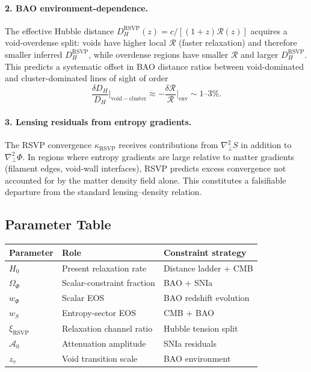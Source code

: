 \documentclass[12pt,a4paper]{article}
\theoremstyle{remark}
\newcommand{\Rcal}{\mathcal{R}}
\newcommand{\Acal}{\mathcal{A}}
\newcommand{\DHr}{D_H^{\mathrm{RSVP}}}
\begin{document}
\paragraph{2. BAO environment-dependence.}
The effective Hubble distance $\DHr(z) = c/[(1+z)\Rcal(z)]$ acquires a
void-overdense split: voids have higher local $\Rcal$ (faster relaxation) and
therefore smaller inferred $\DHr$, while overdense regions have smaller $\Rcal$
and larger $\DHr$. This predicts a systematic offset in BAO distance ratios
between void-dominated and cluster-dominated lines of sight of order
\begin{equation}
\frac{\delta D_H}{D_H}\bigg|_{\mathrm{void-cluster}}
\approx -\frac{\delta\Rcal}{\Rcal}\bigg|_{\mathrm{env}} \sim 1\text{--}3\%.
\end{equation}

\paragraph{3. Lensing residuals from entropy gradients.}
The RSVP convergence $\kappa_{\mathrm{RSVP}}$ receives contributions from
$\nabla_\perp^2 S$ in addition to $\nabla_\perp^2\Phi$. In regions where
entropy gradients are large relative to matter gradients (filament edges,
void-wall interfaces), RSVP predicts excess convergence not accounted for by
the matter density field alone. This constitutes a falsifiable departure from
the standard lensing--density relation.

\subsection{Parameter Table}

\begin{center}
\begin{tabular}{lll}
\toprule
Parameter & Role & Constraint strategy \\
\midrule
$H_0$ & Present relaxation rate & Distance ladder + CMB \\
$\Omega_\Phi$ & Scalar-constraint fraction & BAO + SNIa \\
$w_\Phi$ & Scalar EOS & BAO redshift evolution \\
$w_S$ & Entropy-sector EOS & CMB + BAO \\
$\xi_{\mathrm{RSVP}}$ & Relaxation channel ratio & Hubble tension split \\
$\Acal_0$ & Attenuation amplitude & SNIa residuals \\
$z_v$ & Void transition scale & BAO environment \\
\bottomrule
\end{tabular}
\end{center}
\end{document}
